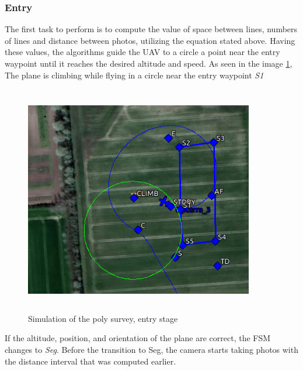 \subsubsection{Entry}
The first task to perform is to compute the value of space between lines, numbers of lines and distance between photos, utilizing the equation stated above. Having these values, the algorithms guide the UAV to a circle a point near the entry waypoint until it reaches the desired altitude and speed. As seen in the image \ref{fig:entry_stage}, The plane is climbing while flying in a circle near the entry waypoint \textit{S1}
\begin{figure}[H]
\centering
\includegraphics[width=10cm,height=10cm,keepaspectratio]{imagenes/Entry.png}
\caption{Simulation of the poly survey, entry stage}
\label{fig:entry_stage}
\end{figure}
If the altitude, position, and orientation of the plane are correct, the FSM changes to \textit{Seg}. Before the transition to Seg, the camera starts taking photos with the distance interval that was computed earlier.
